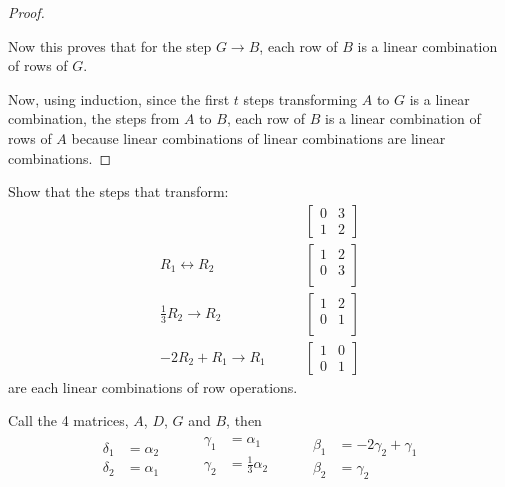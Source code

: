 \begin{proof}
\begin{enumerate}[label=(\roman*)]
\end{enumerate}

Now this proves that for the step $G \rightarrow B$, each row of $B$ is a linear combination of rows of $G$.  

Now, using induction, since the first $t$ steps transforming $A$ to $G$ is a linear combination, the steps from $A$ to $B$, each row of $B$ is a linear combination of rows of $A$ because linear combinations of linear combinations are linear combinations.  

\end{proof}

\vfill \pagebreak

\begin{example}
Show that the steps that transform:
%
\begin{align*}
&\begin{bmatrix}
0 & 3 \\
1 & 2 
\end{bmatrix} \\
  R_1 \leftrightarrow R_2  \qquad &
\begin{bmatrix}
1 & 2 \\
0 & 3 \\
\end{bmatrix} \\ 
\frac{1}{3} R_2 \rightarrow R_2 \qquad & 
\begin{bmatrix}
1 & 2 \\
0 & 1 \\
\end{bmatrix} \\
 -2 R_2 + R_1 \rightarrow R_1 \qquad  &
\begin{bmatrix}
1 & 0 \\
0 & 1 
\end{bmatrix}
\end{align*}
are each linear combinations of row operations. 

\solution

Call the 4 matrices, $A$, $D$, $G$ and $B$, then 
%
\begin{align*}
\begin{split}
\delta_1 & = \alpha_2 \\
\delta_2 & = \alpha_1 
\end{split} &&&
\begin{split}
\gamma_1 & = \alpha_1 \\
\gamma_2 & = \frac{1}{3} \alpha_2 \\
\end{split} &&&
\begin{split}
\beta_1 & = -2 \gamma_2 + \gamma_1 \\
\beta_2 & = \gamma_2 
\end{split}
\end{align*}
\end{example}


